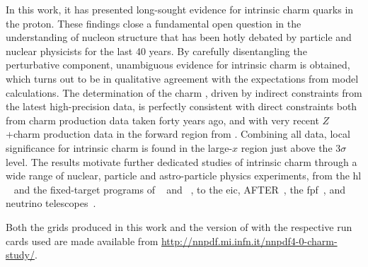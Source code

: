 
In this work, it has presented long-sought evidence for intrinsic charm quarks
in the proton.
%
These findings close a fundamental open question in the understanding of
nucleon structure that has been hotly debated by particle and nuclear
physicists for the last 40 years.
%
By carefully disentangling the perturbative component, unambiguous
evidence for intrinsic charm is obtained, which turns out to be in qualitative
agreement with the expectations from model calculations.
%
The determination of the charm \pdf, driven by indirect constraints from the 
latest high-precision \lhc data, is perfectly consistent with direct
constraints both from \emc charm production data taken forty years ago, and
with very recent $Z$+charm production data in the forward region from \lhcb.
%
Combining all data, local significance for intrinsic charm is found in the
large-$x$ region just above the $3\sigma$ level.
%
The results motivate further dedicated studies of intrinsic charm through a
wide range of nuclear, particle and astro-particle physics experiments, from
the \acrlong{hl} \lhc~\cite{Azzi:2019yne} and the fixed-target programs of
\lhcb~\cite{LHCb:2018jry} and \alice~\cite{QCDWorkingGroup:2019dyv}, to the  
\acrlong{eic}, AFTER~\cite{Hadjidakis:2018ifr}, the
\acrlong{fpf}~\cite{Anchordoqui:2021ghd}, and neutrino
telescopes~\cite{Halzen:2016thi}.

Both the \lhapdf grids produced in this work and the version of \eko with the
respective run cards used are made available from
\url{http://nnpdf.mi.infn.it/nnpdf4-0-charm-study/}.

